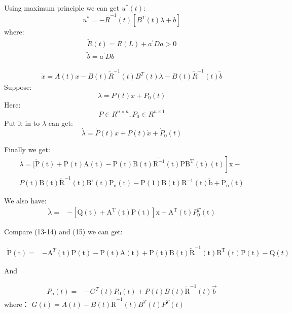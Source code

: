 \documentclass{mcmthesis}
\begin{document}
Using maximum principle we can get $u^{*}(t)$:
$$u^{*}=-\tilde{R}^{-1}(t)\left[B^{T}(t) \lambda+\tilde{b}\right]$$
where:
$$\begin{array}{c}
\widetilde{R}(t)=R(L)+a^{\prime} D a>0 \\
\widetilde{b}=a^{\prime} D b
\end{array}$$

$$\begin{array}{c}
\dot{x}=A(t) x-B(t) \widetilde{R}^{-1}(t) B^T(t) \lambda 
-B(t) \widetilde{R}^{-1}(t) \widetilde{b}
\end{array} $$
Suppose:
$$\lambda=P(t) x+P_0(t)$$
Here:
$$P \in R^{n \times n},  P_{0} \in R^{n \times 1}$$
Put it in to $\lambda$ can get:
$$\dot{\lambda}=\dot{P}(t) x+P(t) \dot{x}+\dot{P}_{0}(t)$$

Finally we get:
\begin{align}\dot{\lambda}=[\dot{\mathrm{P}}(\mathrm{t})+\mathrm{P}(\mathrm{t}) \mathrm{A}(\mathrm{t})-\mathrm{P}(\mathrm{t}) \mathrm{B}(\mathrm{t}) 
\left.\widetilde{\mathrm{R}^{-1}}(\mathrm{t}) \mathrm{PB}^{\mathrm{T}}(\mathrm{t})(\mathrm{t})\right] \mathrm{x}-\\P(\mathrm{t}) \mathrm{B}(\mathrm{t})
\widetilde{\mathrm{R}}^{-1} 
(\mathrm{t}) \mathrm{B}^{\mathrm{r}}(\mathrm{t}) \mathrm{P}_{\mathrm{o}}(\mathrm{t})-\mathrm{P}(1) \mathrm{B}(\mathrm{t}) \mathrm{R}^{-1} 
(\mathrm{t}) \tilde{\mathrm{b}}+\dot{\mathrm{P}}_{\mathrm{o}}(\mathrm{t})
\end{align}

We also have:
\begin{align}
\dot{\lambda}=&-\left[\mathrm{Q}(\mathrm{t})+\mathrm{A}^{\mathrm{T}}(\mathrm{t}) \mathrm{P}(\mathrm{t})\right] \mathrm{x} 
-\mathrm{A}^{\mathrm{T}}(\mathrm{t}) P_0^T(\mathrm{t})
\end{align}

Compare (13-14) and (15) we can get:

\begin{align}
\dot{\mathrm{P}}(\mathrm{t})=&-\mathrm{A}^{T}(\mathrm{t}) \mathrm{P}(\mathrm{t})-\mathrm{P}(\mathrm{t}) \mathrm{A}(\mathrm{t})+\mathrm{P}(\mathrm{t}) \mathrm{B}(\mathrm{t}) \widetilde{\mathrm{R}}^{-1}(\mathrm{t}) \mathrm{B}^{\mathrm{T}}(\mathrm{t})  \mathrm{P}(\mathrm{t})-\mathrm{Q}(t)
\end{align}

And

\begin{align}
\dot{P}_{o}(t)=&-G^{T}(t) P_{0}(t)+P(t) B(t) \widetilde{\mathrm{R}}^{-1}(t) \vec{b} 
\end{align}
where： $G(t)=A(t)-B(t) \widetilde{\mathrm{R}}^{-1}(t) B^{T}(t) P^T(t)$
\end{document}
